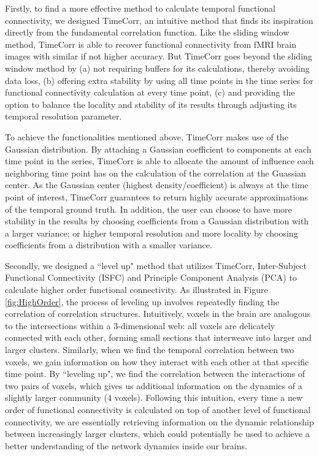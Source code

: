 \documentclass[11pt]{article}
\begin{document}
Firstly, to find a more effective method to calculate temporal functional connectivity, we designed TimeCorr, an intuitive method that finds its inspiration directly from the fundamental correlation function. Like the sliding window method, TimeCorr is able to recover functional connectivity from fMRI brain images with similar if not higher accuracy. But TimeCorr goes beyond the sliding window method by (a) not requiring buffers for its calculations, thereby avoiding data loss, (b) offering extra stability by using all time points in the time series for functional connectivity calculation at every time point, (c) and providing the option to balance the locality and stability of its results through adjusting its temporal resolution parameter.

To achieve the functionalities mentioned above, TimeCorr makes use of the Gaussian distribution. By attaching a Gaussian coefficient to components at each time point in the series, TimeCorr is able to allocate the amount of influence each neighboring time point has on the calculation of the correlation at the Guassian center. As the Gaussian center (highest density/coefficient) is always at the time point of interest, TimeCorr guarantees to return highly accurate approximations of the temporal ground truth. In addition, the user can choose to have more stability in the results by choosing coefficients from a Gaussian distribution with a larger variance; or higher temporal resolution and more locality by choosing coefficients from a distribution with a smaller variance.

Secondly, we designed a ``level up" method that utilizes TimeCorr, Inter-Subject Functional Connectivity (ISFC) and Principle Component Analysis (PCA) to calculate higher order functional connectivity. As illustrated in Figure \ref{fig:HighOrder}, the process of leveling up involves repeatedly finding the correlation of correlation structures. Intuitively, voxels in the brain are analogous to the intersections within a 3-dimensional web: all voxels are delicately connected with each other, forming small sections that interweave into larger and larger clusters. Similarly, when we find the temporal correlation between two voxels, we gain information on how they interact with each other at that specific time point. By ``leveling up", we find the correlation between the interactions of two pairs of voxels, which gives us additional information on the dynamics of a slightly larger community (4 voxels). Following this intuition, every time a new order of functional connectivity is calculated on top of another level of functional connectivity, we are essentially retrieving information on the dynamic relationship between increasingly larger clusters, which could potentially be used to achieve a better understanding of the network dynamics inside our brains.
\end{document}
